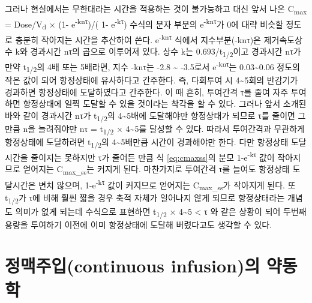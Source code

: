 \documentclass[
  11pt,
  krantz2, a4paper, twoside]{krantz}
\theoremstyle{definition}
\theoremstyle{definition}
\theoremstyle{definition}
\theoremstyle{definition}
\theoremstyle{remark}
\begin{document}
그러나 현실에서는 무한대라는 시간을 적용하는 것이 불가능하고 대신 앞서 나온 C\textsubscript{max} = Dose/V\textsubscript{d} × (1- e\textsuperscript{-knτ})/( 1- e\textsuperscript{-kτ}) 수식의 분자 부분의 e\textsuperscript{-knτ}가 0에 대략 비슷할 정도로 충분히 작아지는 시간을 추산하여 쓴다.
e\textsuperscript{-knτ} 식에서 지수부분(-knτ)은 제거속도상수 k와 경과시간 nτ의 곱으로 이루어져 있다.
상수 k는 0.693/t\textsubscript{1/2}이고 경과시간 nτ가 만약 t\textsubscript{1/2}의 4배 또는 5배라면, 지수 -knτ는 -2.8 \textasciitilde{} -3.5로서 e\textsuperscript{-knτ}는 0.03\textasciitilde0.06 정도의 작은 값이 되어 항정상태에 유사하다고 간주한다. 
즉, 다회투여 시 4\textasciitilde5회의 반감기가 경과하면 항정상태에 도달하였다고 간주한다. 
이 때 흔히, 투여간격 τ를 줄여 자주 투여하면 항정상태에 일찍 도달할 수 있을 것이라는 착각을 할 수 있다. 
그러나 앞서 소개된 바와 같이 경과시간 nτ가 t\textsubscript{1/2}의 4\textasciitilde5배에 도달해야만 항정상태가 되므로 τ를 줄이면 그만큼 n을 늘려줘야만 nτ = t\textsubscript{1/2} × 4\textasciitilde5를 달성할 수 있다. 따라서 투여간격과 무관하게 항정상태에 도달하려면 t\textsubscript{1/2}의 4\textasciitilde5배만큼 시간이 경과해야만 한다. 
다만 항정상태 도달시간을 줄이지는 못하지만 τ가 줄어든 만큼 식 \eqref{eq:cmaxss}의 분모 1-e\textsuperscript{-kτ} 값이 작아지므로 얻어지는 C\textsubscript{max\_ss}는 커지게 된다. 
마찬가지로 투여간격 τ를 늘여도 항정상태 도달시간은 변치 않으며, 1-e\textsuperscript{-kτ} 값이 커지므로 얻어지는 C\textsubscript{max\_ss}가 작아지게 된다. 
또 t\textsubscript{1/2}가 τ에 비해 훨씬 짧을 경우 축적 자체가 일어나지 않게 되므로 항정상태라는 개념도 의미가 없게 되는데 수식으로 표현하면 t\textsubscript{1/2} × 4\textasciitilde5 \textless{} τ 와 같은 상황이 되어 두번째 용량을 투여하기 이전에 이미 항정상태에 도달해 버렸다고도 생각할 수 있다.

\hypertarget{uxc815uxb9e5uxc8fcuxc785continuous-infusionuxc758-uxc57duxb3d9uxd559}{%
\section{\texorpdfstring{정맥주입(continuous infusion)의 약동학}{정맥주입(continuous infusion)의 약동학}}\label{uxc815uxb9e5uxc8fcuxc785continuous-infusionuxc758-uxc57duxb3d9uxd559}}
\end{document}

